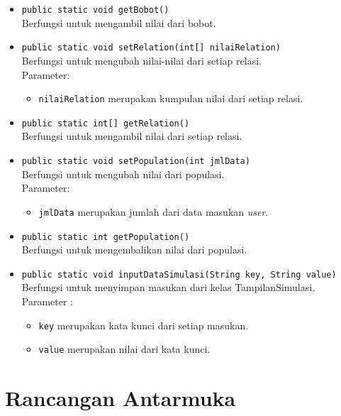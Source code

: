 \begin{itemize}
		\item \texttt{public static void getBobot()}\\
		Berfungsi untuk mengambil nilai dari bobot.
		
		\item \texttt{public static void setRelation(int[] nilaiRelation)}\\
		Berfungsi untuk mengubah nilai-nilai dari setiap relasi.\\
		Parameter:
		\begin{itemize}
			\item \texttt{nilaiRelation} merupakan kumpulan nilai dari setiap relasi.
		\end{itemize}
		
		\item \texttt{public static int[] getRelation()}\\
		Berfungsi untuk mengambil nilai dari setiap relasi.
		
		\item \texttt{public static void setPopulation(int jmlData)}\\
		Berfungsi untuk mengubah nilai dari populasi.\\
		Parameter:
		\begin{itemize}
			\item \texttt{jmlData} merupakan jumlah dari data masukan \textit{user}.
		\end{itemize}
		
		\item \texttt{public static int getPopulation()}\\
		Berfungsi untuk mengembalikan nilai dari populasi.
		
		\item \texttt{public static void inputDataSimulasi(String key, String value)}\\
		Berfungsi untuk menyimpan masukan dari kelas TampilanSimulasi.\\
		Parameter :
		\begin{itemize}
			\item \texttt{key} merupakan kata kunci dari setiap masukan.
			\item \texttt{value} merupakan nilai dari kata kunci.
		\end{itemize}
	\end{itemize}


\section{Rancangan Antarmuka}
\label{sec:rancanganantarmuka}

